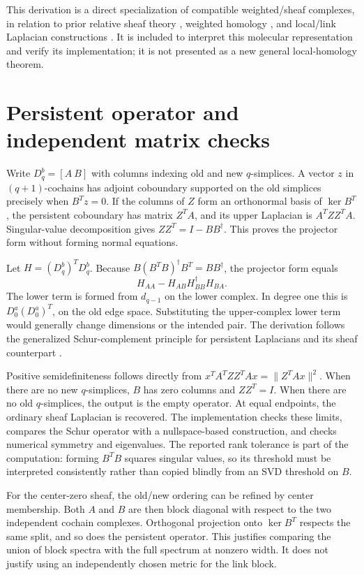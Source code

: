 \documentclass[10pt]{article}
\begin{document}
This derivation is a direct specialization of compatible weighted/sheaf complexes, in relation to prior relative sheaf theory \citep{hansen2019}, weighted homology \citep{renwu2021}, and local/link Laplacian constructions \citep{liu2026}. It is included to interpret this molecular representation and verify its implementation; it is not presented as a new general local-homology theorem.

\section{Persistent operator and independent matrix checks}
Write $D_q^b=[A\ B]$ with columns indexing old and new $q$-simplices. A vector $z$ in $(q+1)$-cochains has adjoint coboundary supported on the old simplices precisely when $B^Tz=0$. If the columns of $Z$ form an orthonormal basis of $\ker B^T$, the persistent coboundary has matrix $Z^TA$, and its upper Laplacian is $A^TZZ^TA$. Singular-value decomposition gives $ZZ^T=I-BB^\dagger$. This proves the projector form without forming normal equations.

Let $H=(D_q^b)^TD_q^b$. Because $B(B^TB)^\dagger B^T=BB^\dagger$, the projector form equals
\begin{equation}
H_{AA}-H_{AB}H_{BB}^\dagger H_{BA}.
\end{equation}
The lower term is formed from $d_{q-1}$ on the lower complex. In degree one this is $D_0^a(D_0^a)^T$, on the old edge space. Substituting the upper-complex lower term would generally change dimensions or the intended pair. The derivation follows the generalized Schur-complement principle for persistent Laplacians and its sheaf counterpart \citep{memoli2022,wei2025}.

Positive semidefiniteness follows directly from $x^TA^TZZ^TAx=\|Z^TAx\|^2$. When there are no new $q$-simplices, $B$ has zero columns and $ZZ^T=I$. When there are no old $q$-simplices, the output is the empty operator. At equal endpoints, the ordinary sheaf Laplacian is recovered. The implementation checks these limits, compares the Schur operator with a nullspace-based construction, and checks numerical symmetry and eigenvalues. The reported rank tolerance is part of the computation: forming $B^TB$ squares singular values, so its threshold must be interpreted consistently rather than copied blindly from an SVD threshold on $B$.

For the center-zero sheaf, the old/new ordering can be refined by center membership. Both $A$ and $B$ are then block diagonal with respect to the two independent cochain complexes. Orthogonal projection onto $\ker B^T$ respects the same split, and so does the persistent operator. This justifies comparing the union of block spectra with the full spectrum at nonzero width. It does not justify using an independently chosen metric for the link block.
\end{document}
